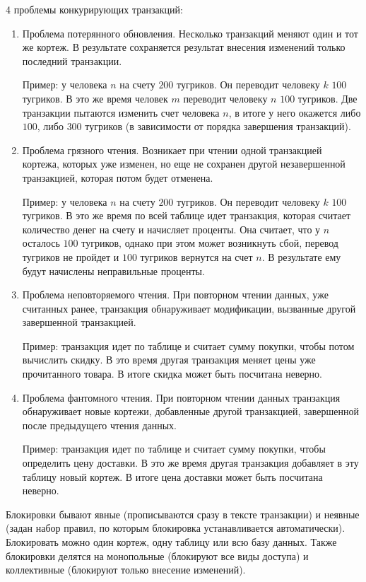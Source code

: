 4 проблемы конкурирующих транзакций:
\begin{enumerate}
\item
  Проблема потерянного обновления. Несколько транзакций меняют один и тот же
  кортеж. В результате сохраняется результат внесения изменений только последний
  транзакции.

  Пример: у человека \(n\) на счету \(200\) тугриков. Он переводит человеку
  \(k\) \(100\) тугриков. В это же время человек \(m\) переводит человеку \(n\)
  \(100\) тугриков. Две транзакции пытаются изменить счет человека \(n\), в
  итоге у него окажется либо \(100\), либо \(300\) тугриков (в зависимости от
  порядка завершения транзакций).

\item
  Проблема грязного чтения. Возникает при чтении одной транзакцией кортежа,
  которых уже изменен, но еще не сохранен другой незавершенной транзакцией,
  которая потом будет отменена.

  Пример: у человека \(n\) на счету \(200\) тугриков. Он переводит человеку
  \(k\) \(100\) тугриков. В это же время по всей таблице идет транзакция,
  которая считает количество денег на счету и начисляет проценты. Она считает,
  что у \(n\) осталось \(100\) тугриков, однако при этом может возникнуть сбой,
  перевод тугриков не пройдет и \(100\) тугриков вернутся на счет \(n\). В
  результате ему будут начислены неправильные проценты.

\item
  Проблема неповторяемого чтения. При повторном чтении данных, уже считанных
  ранее, транзакция обнаруживает модификации, вызванные другой завершенной
  транзакцией.

  Пример: транзакция идет по таблице и считает сумму покупки, чтобы потом
  вычислить скидку. В это время другая транзакция меняет цены уже прочитанного
  товара. В итоге скидка может быть посчитана неверно.

\item
  Проблема фантомного чтения. При повторном чтении данных транзакция
  обнаруживает новые кортежи, добавленные другой транзакцией, завершенной после
  предыдущего чтения данных.

  Пример: транзакция идет по таблице и считает сумму покупки, чтобы определить
  цену доставки. В это же время другая транзакция добавляет в эту таблицу новый
  кортеж. В итоге цена доставки может быть посчитана неверно.
\end{enumerate}

Блокировки бывают явные (прописываются сразу в тексте транзакции) и неявные
(задан набор правил, по которым блокировка устанавливается автоматически).
Блокировать можно один кортеж, одну таблицу или всю базу данных. Также
блокировки делятся на монопольные (блокируют все виды доступа) и коллективные
(блокируют только внесение изменений).

